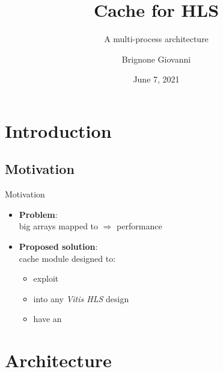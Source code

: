 \documentclass[handout,aspectratio=169]{beamer}
\title{Cache for HLS}
\subtitle{A multi-process architecture}
\author{Brignone Giovanni}
\date{June 7, 2021}
\begin{document}
\begin{frame}
	\maketitle
\end{frame}

\section{Introduction}
\subsection{Motivation}
\begin{frame}{Motivation}
	\begin{itemize}[<+->]
		\item \textbf{Problem}:\\
			big arrays mapped to  $\Rightarrow$
			performance 
		\item \textbf{Proposed solution}:\\
			cache module designed to:
			\begin{itemize}[<.->]
				\item exploit 
				\item {} into any
					\emph{Vitis HLS} design
				\item have an 
			\end{itemize}
	\end{itemize}
\end{frame}

\section{Architecture}
\end{document}
